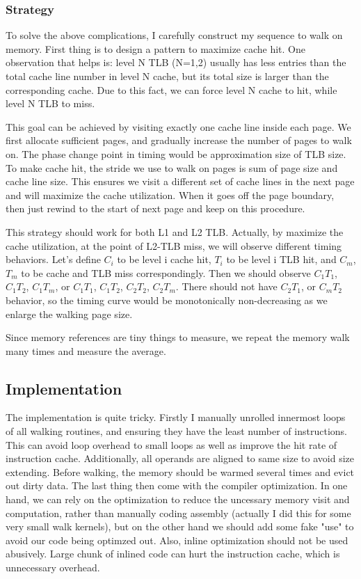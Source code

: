 \subsubsection{Strategy}
To solve the above complications, I carefully construct my sequence to walk on
memory. First thing is to design a pattern to maximize cache hit. One
observation that helps is: level N TLB (N=1,2) usually has less entries than the total
cache line number in level N cache, but its total size is larger than the corresponding
cache. Due to this fact, we can force level N cache to hit, while level N TLB to miss.

This goal can be achieved by visiting exactly one cache line inside each page.
We first allocate sufficient pages, and gradually increase the number of pages
to walk on.  The phase change point in timing would be approximation size of
TLB size. To make cache hit, the stride we use to walk on pages is sum of page
size and cache line size. This ensures we visit a different set of cache lines
in the next page and will maximize the cache utilization. When it goes off the
page boundary, then just rewind to the start of next page and keep on this
procedure. 

This strategy should work for both L1 and L2 TLB. Actually, by maximize the cache
utilization, at the point of L2-TLB miss, we will observe different timing
behaviors. Let's define $C_i$ to be level i cache hit, $T_i$ to be level i
TLB hit, and $C_m$, $T_m$ to be cache and TLB miss correspondingly. Then we
should observe $C_1T_1$, $C_1T_2$, $C_1T_m$, or $C_1T_1$, $C_1T_2$, $C_2T_2$,
$C_2T_m$. There should not have $C_2T_1$, or $C_mT_2$ behavior, so the timing
curve would be monotonically non-decreasing as we enlarge the walking page size.

Since memory references are tiny things to measure, we repeat the memory walk
many times and measure the average.

\subsection{Implementation}
The implementation is quite tricky. Firstly I manually unrolled innermost loops
of all walking routines, and ensuring they have the least number of
instructions. This can avoid loop overhead to small loops as well as improve
the hit rate of instruction cache. Additionally, all operands are aligned to same
size to avoid size extending. Before walking, the memory should be warmed
several times and evict out dirty data. The last thing then come with the
compiler optimization. In one hand, we can rely on the optimization to reduce
the uncessary memory visit and computation, rather than manually coding
assembly (actually I did this for some very small walk kernels), but on the
other hand we should add some fake "use" to avoid our code being optimzed out.
Also, inline optimization should not be used abusively. Large chunk of inlined
code can hurt the instruction cache, which is unnecessary overhead.

